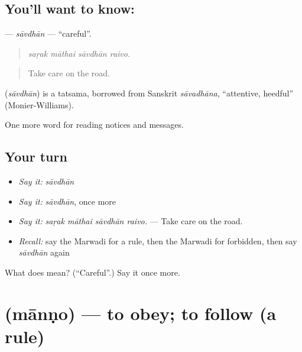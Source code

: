 \subsection*{You'll want to know: }
\textbf{} — \emph{sāvdhān} — \textquotedblleft{}careful\textquotedblright{}.

\begin{quote}
   
\end{quote}

\begin{quote}
\emph{saṛak māthai sāvdhān raivo.}
\end{quote}

\begin{quote}
Take care on the road.
\end{quote}

\begin{cousinweb}
\textbf{} (\emph{sāvdhān}) is a tatsama, borrowed from Sanskrit \emph{sāvadhāna}, \textquotedblleft{}attentive, heedful\textquotedblright{} (Monier-Williams).
\end{cousinweb}

\begin{grammarlens}[title={What you've built}]
One more word for reading notices and messages.
\end{grammarlens}

\subsection*{Your turn}
\begin{itemize}
\raggedright
  \item \emph{Say it:} \emph{sāvdhān}
  \item \emph{Say it:} \emph{sāvdhān}, once more
  \item \emph{Say it:} \emph{saṛak māthai sāvdhān raivo.} — Take care on the road.
  \item \emph{Recall:} say the Marwadi for a rule, then the Marwadi for forbidden, then say \emph{sāvdhān} again
\end{itemize}

\begin{tcolorbox}[breakable,colback=teal!4,colframe=teal!35!black,title={Before you move on}]
What does  mean? (\textquotedblleft{}Careful\textquotedblright{}.) Say it once more.
\end{tcolorbox}
\section[\texorpdfstring{\mw{मानणो} (mānṇo)}{मानणो (mānṇo)}]{ (mānṇo) — to obey; to follow (a rule)}

